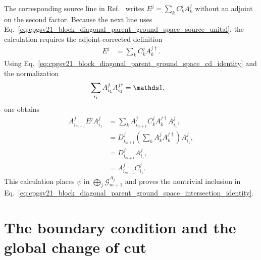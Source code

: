 \documentclass{article}
\begin{document}
The corresponding source line in Ref.~\cite{PerezGarcia2007MPSReps} writes
$E^j=\sum_k C^j_kA^j_k$ without an adjoint on the second factor. Because the
next line uses
Eq.~\ref{eq:cpgsv21_block_diagonal_parent_ground_space_source_unital}, the
calculation requires the adjoint-corrected definition
\begin{align}
  E^j
    &=
    \sum_k C^j_kA^{j\dagger}_k.
  \label{eq:cpgsv21_block_diagonal_parent_ground_space_corrected_e}
\end{align}
Using Eq.~\ref{eq:cpgsv21_block_diagonal_parent_ground_space_cd_identity} and
the normalization
\begin{align}
  \sum_{i_1}A^j_{i_1}A^{j\dagger}_{i_1}
    &=
    \Id,
  \label{eq:cpgsv21_block_diagonal_parent_ground_space_intersection_normalization}
\end{align}
one obtains
\begin{align}
  A^j_{i_{m+1}}E^jA^j_{i_1}
    &=
    \sum_k
    A^j_{i_{m+1}}C^j_kA^{j\dagger}_kA^j_{i_1},
  \label{eq:cpgsv21_block_diagonal_parent_ground_space_e_expand}\\
  &=
    D^j_{i_{m+1}}
    \left(\sum_k A^j_kA^{j\dagger}_k\right)A^j_{i_1},
  \label{eq:cpgsv21_block_diagonal_parent_ground_space_e_substitute}\\
  &=
    D^j_{i_{m+1}}A^j_{i_1},
  \label{eq:cpgsv21_block_diagonal_parent_ground_space_e_normalize}\\
  &=
    A^j_{i_{m+1}}C^j_{i_1}.
  \label{eq:cpgsv21_block_diagonal_parent_ground_space_e_conclude}
\end{align}
This calculation places $\psi$ in
$\bigoplus_j\mathcal G_{m+1}^{A_j}$ and proves the nontrivial inclusion in
Eq.~\ref{eq:cpgsv21_block_diagonal_parent_ground_space_intersection_identity}.

\section{The boundary condition and the global change of cut}
\end{document}
